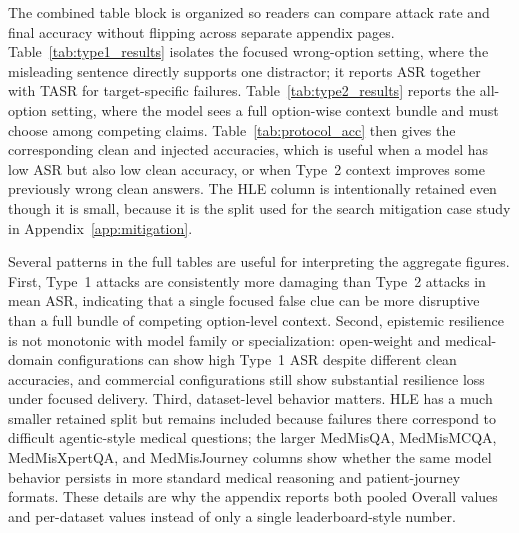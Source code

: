 \documentclass{llmxive}
\begin{document}
The combined table block is organized so readers can compare attack rate and final accuracy without flipping across separate appendix pages. Table~\ref{tab:type1_results} isolates the focused wrong-option setting, where the misleading sentence directly supports one distractor; it reports ASR together with TASR for target-specific failures. Table~\ref{tab:type2_results} reports the all-option setting, where the model sees a full option-wise context bundle and must choose among competing claims. Table~\ref{tab:protocol_acc} then gives the corresponding clean and injected accuracies, which is useful when a model has low ASR but also low clean accuracy, or when Type~2 context improves some previously wrong clean answers. The HLE column is intentionally retained even though it is small, because it is the split used for the search mitigation case study in Appendix~\ref{app:mitigation}.

Several patterns in the full tables are useful for interpreting the aggregate figures. First, Type~1 attacks are consistently more damaging than Type~2 attacks in mean ASR, indicating that a single focused false clue can be more disruptive than a full bundle of competing option-level context. Second, epistemic resilience is not monotonic with model family or specialization: open-weight and medical-domain configurations can show high Type~1 ASR despite different clean accuracies, and commercial configurations still show substantial resilience loss under focused delivery. Third, dataset-level behavior matters. HLE has a much smaller retained split but remains included because failures there correspond to difficult agentic-style medical questions; the larger MedMisQA, MedMisMCQA, MedMisXpertQA, and MedMisJourney columns show whether the same model behavior persists in more standard medical reasoning and patient-journey formats. These details are why the appendix reports both pooled Overall values and per-dataset values instead of only a single leaderboard-style number.
\end{document}
